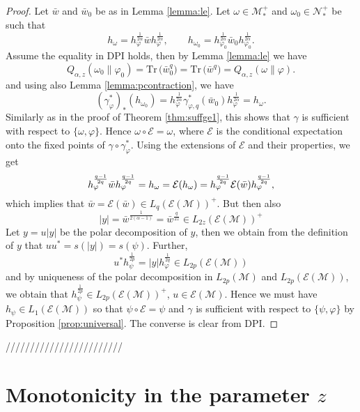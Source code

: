 \documentclass[12pt]{article}
\theoremstyle{definition}
\theoremstyle{remark}
\numberwithin{equation}{section}
\def\cE{\mathcal E}
\def\Me{\mathcal M}
\def\Ne{\mathcal N}
\def \Tr{\mathrm{Tr}\,}
\def\ffi{\varphi}
\begin{document}
\begin{proof} Let $\bar w$ and $\bar w_0$ be as in Lemma \ref{lemma:le}. Let $\omega\in
\Me_*^+$ and $\omega_0\in \Ne_*^+$ be such that
\[
h_\omega=h_\ffi^{\frac1{2\alpha}}\bar wh_\ffi^{\frac1{2\alpha}},\qquad
h_{\omega_0}=h_{\ffi_0}^{\frac1{2\alpha}}\bar w_0h_{\ffi_0}^{\frac1{2\alpha}}.
\]
 Assume the equality in DPI holds, then by Lemma
\ref{lemma:le} we have
\[
Q_{\alpha,z}(\omega_0\|\varphi_0)=\Tr \bigl(\bar w_0^q\bigr)=\Tr \bigl(\bar
w^q\bigr)=Q_{\alpha,z}(\omega\|\varphi).
\]
and using also Lemma \ref{lemma:pcontraction}, we have
\[
(\gamma^*_\ffi)_*(h_{\omega_0})=h_\ffi^{\frac1{2\alpha}}\gamma^*_{\ffi,q}(\bar
w_0)h_\ffi^{\frac1{2\alpha}}=h_\omega.
\]
Similarly as in the proof of Theorem \ref{thm:suffge1}, this shows that $\gamma$ is sufficient with
respect to $\{\omega,\ffi\}$. Hence $\omega\circ \cE=\omega$, where $\cE$ is the
conditional expectation onto the fixed points of $\gamma\circ\gamma^*_\ffi$.  Using the
extensions of $\cE$ and their
properties, we get
\[
h_\varphi^{q-1\over2q}\bar
wh_\varphi^{q-1\over 2q}=h_\omega=\cE(h_\omega)=h_\varphi^{q-1\over 2q}\cE(\bar
w)h_\varphi^{q-1\over 2q},
\]
which implies that $\bar w=\cE(\bar w)\in L_q(\cE(\Me))^+$. But then also 
\[
|y|=\bar w^{\frac1{2(\alpha-1)}}=\bar w^{\frac{q}{2z}}\in L_{2z}(\cE(\Me))^+
\]
Let $y=u|y|$ be the polar decomposition of $y$, then we obtain from the definition of $y$ that
$uu^*=s(|y|)=s(\psi)$. Further,
\[
u^*h_\psi^{\frac1{2p}}=|y|h_\varphi^{\frac1{2q}}\in L_{2p}(\cE(\Me))
\]
and by uniqueness of the polar decomposition in $L_{2p}(\Me)$ and $L_{2p}(\cE(\Me))$, we
obtain that $h_{\psi}^{\frac1{2p}}\in L_{2p}(\cE(\Me))^+$, $u\in \cE(\Me)$. Hence we must
have $h_\psi\in L_1(\cE(\Me))$ so that $\psi\circ\cE=\psi$ and $\gamma$ is sufficient with
respect to $\{\psi,\ffi\}$ by Proposition \ref{prop:universal}. The converse is clear from
DPI.


\end{proof}



////////////////////////

\section{Monotonicity in the parameter $z$}
\end{document}
